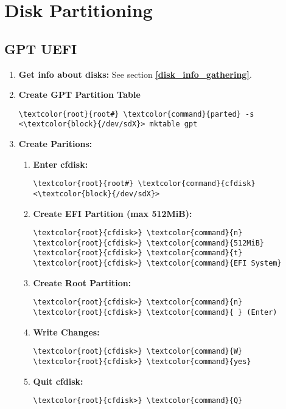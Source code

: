 \documentclass[10pt, a4paper, onecolumn, openany]{book} %
\begin{document}
\section{Disk Partitioning}
\subsection{GPT UEFI}
\begin{enumerate}
    \item \textbf{Get info about disks:}
\newline See section \underline{\textbf{\ref{disk_info_gathering}}}.

    \item \textbf{Create GPT Partition Table}
\begin{Verbatim}[commandchars=\\\{\}]
\textcolor{root}{root#} \textcolor{command}{parted} -s <\textcolor{block}{/dev/sdX}> mktable gpt
\end{Verbatim}

    \item \textbf{Create Paritions:}
    \begin{enumerate}
        \item \textbf{Enter cfdisk:}
\begin{Verbatim}[commandchars=\\\{\}]
\textcolor{root}{root#} \textcolor{command}{cfdisk}  <\textcolor{block}{/dev/sdX}>
\end{Verbatim}
        \item \textbf{Create EFI Partition (max 512MiB):}
\begin{Verbatim}[commandchars=\\\{\}]
\textcolor{root}{cfdisk>} \textcolor{command}{n}
\textcolor{root}{cfdisk>} \textcolor{command}{512MiB}
\textcolor{root}{cfdisk>} \textcolor{command}{t}
\textcolor{root}{cfdisk>} \textcolor{command}{EFI System}
\end{Verbatim}
        \item \textbf{Create Root Partition:}
\begin{Verbatim}[commandchars=\\\{\}]
\textcolor{root}{cfdisk>} \textcolor{command}{n}
\textcolor{root}{cfdisk>} \textcolor{command}{ } (Enter)
\end{Verbatim}        
        \item \textbf{Write Changes:}
\begin{Verbatim}[commandchars=\\\{\}]
\textcolor{root}{cfdisk>} \textcolor{command}{W}
\textcolor{root}{cfdisk>} \textcolor{command}{yes}
\end{Verbatim}
        \item \textbf{Quit cfdisk:}
\begin{Verbatim}[commandchars=\\\{\}]
\textcolor{root}{cfdisk>} \textcolor{command}{Q}
\end{Verbatim}
    \end{enumerate}


\end{enumerate}
\end{document}
